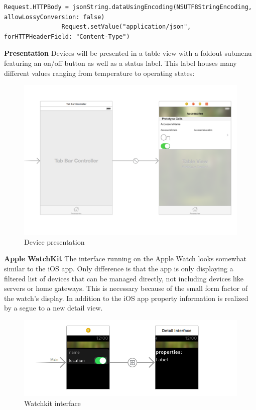	        	\begin{lstlisting}[caption=Additional header information]
	        	Request.HTTPBody = jsonString.dataUsingEncoding(NSUTF8StringEncoding, allowLossyConversion: false)
        		Request.setValue("application/json", forHTTPHeaderField: "Content-Type")
	        	\end{lstlisting}

	        	\pagebreak

			\textbf{Presentation}
				Devices will be presented in a table view with a foldout submenu featuring an on/off button as well as a status label. This label houses many different values ranging from temperature to operating states:

				\begin{figure}[h]
					\centering
						\includegraphics[width=.9\textwidth]{images/praxis/SmartHomeAppDesignOverview.png}
					\caption{Device presentation}
					\label{fig:ConceptIdea}
				\end{figure}

			\textbf{Apple WatchKit}
				The interface running on the Apple Watch looks somewhat similar to the iOS app. Only difference is that the app is only displaying a filtered list of devices that can be managed directly, not including devices like servers or home gateways. This is necessary because of the small form factor of the watch's display. In addition to the iOS app property information is realized by a segue to a new detail view.

				\begin{figure}[h]
					\centering
						\includegraphics[width=.9\textwidth]{images/praxis/SmartHomeWatchkitInterface.png}
					\caption{Watchkit interface}
					\label{fig:ConceptIdea}
				\end{figure}

